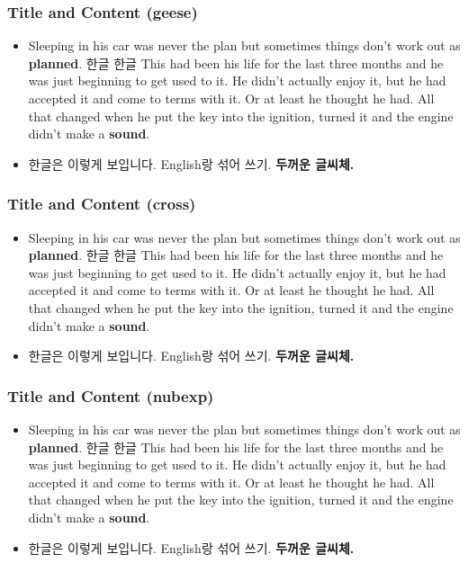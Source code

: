 \begin{frame}
    \frametitle{\geese Title and Content (geese)}
    \Large
    \begin{itemize}
    \item Sleeping in his car was never the plan but sometimes things don't work out as \textbf{planned}. 한글 한글 This had been his life for the last three months and he was just beginning to get used to it. He didn't actually enjoy it, but he had accepted it and come to terms with it. Or at least he thought he had. All that changed when he put the key into the ignition, turned it and the engine didn't make a \textbf{sound}.
    \item 한글은 이렇게 보입니다. English랑 섞어 쓰기. \textbf{두꺼운 글씨체.}
    \end{itemize}
\end{frame}

\begin{frame}
    \frametitle{\cross Title and Content (cross)}
    \Large
    \begin{itemize}
    \item Sleeping in his car was never the plan but sometimes things don't work out as \textbf{planned}. 한글 한글 This had been his life for the last three months and he was just beginning to get used to it. He didn't actually enjoy it, but he had accepted it and come to terms with it. Or at least he thought he had. All that changed when he put the key into the ignition, turned it and the engine didn't make a \textbf{sound}.
    \item 한글은 이렇게 보입니다. English랑 섞어 쓰기. \textbf{두꺼운 글씨체.}
    \end{itemize}
\end{frame}

\begin{frame}
    \frametitle{\nubexp Title and Content (nubexp)}
    \Large
    \begin{itemize}
    \item Sleeping in his car was never the plan but sometimes things don't work out as \textbf{planned}. 한글 한글 This had been his life for the last three months and he was just beginning to get used to it. He didn't actually enjoy it, but he had accepted it and come to terms with it. Or at least he thought he had. All that changed when he put the key into the ignition, turned it and the engine didn't make a \textbf{sound}.
    \item 한글은 이렇게 보입니다. English랑 섞어 쓰기. \textbf{두꺼운 글씨체.}
    \end{itemize}
\end{frame}






